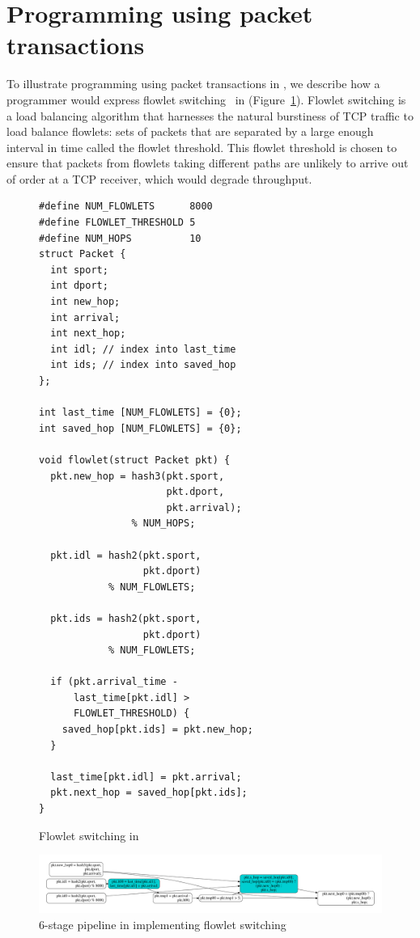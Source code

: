 \section{Programming using packet transactions}
\label{s:transactions}

To illustrate programming using packet transactions in \pktlanguage, we
describe how a programmer would express flowlet switching~\cite{flowlets} in
\pktlanguage (Figure~\ref{fig:flowlet}).  Flowlet switching is a load balancing
algorithm that harnesses the natural burstiness of TCP traffic to load balance
flowlets: sets of packets that are separated by a large enough interval in time
called the flowlet threshold.  This flowlet threshold is chosen to ensure that
packets from flowlets taking different paths are unlikely to arrive out of
order at a TCP receiver, which would degrade throughput.

\begin{figure}[!h]
\begin{small}
  \begin{lstlisting}[style=customc]
#define NUM_FLOWLETS      8000
#define FLOWLET_THRESHOLD 5
#define NUM_HOPS          10
struct Packet {
  int sport;
  int dport;
  int new_hop;
  int arrival;
  int next_hop;
  int idl; // index into last_time
  int ids; // index into saved_hop
};

int last_time [NUM_FLOWLETS] = {0};
int saved_hop [NUM_FLOWLETS] = {0};

void flowlet(struct Packet pkt) {
  pkt.new_hop = hash3(pkt.sport,
                      pkt.dport,
                      pkt.arrival);
                % NUM_HOPS;

  pkt.idl = hash2(pkt.sport,
                  pkt.dport)
            % NUM_FLOWLETS;

  pkt.ids = hash2(pkt.sport,
                  pkt.dport)
            % NUM_FLOWLETS;

  if (pkt.arrival_time -
      last_time[pkt.idl] >
      FLOWLET_THRESHOLD) {
    saved_hop[pkt.ids] = pkt.new_hop;
  }

  last_time[pkt.idl] = pkt.arrival;
  pkt.next_hop = saved_hop[pkt.ids];
}
\end{lstlisting}
\end{small}
\caption{Flowlet switching in \pktlanguage}
\label{fig:flowlet}
\end{figure}

\begin{figure}[!t]
  \includegraphics[width=\textwidth]{pipe.pdf}
  \caption{6-stage pipeline in \absmachine implementing flowlet switching}
  \label{fig:pipeline}
\end{figure}

